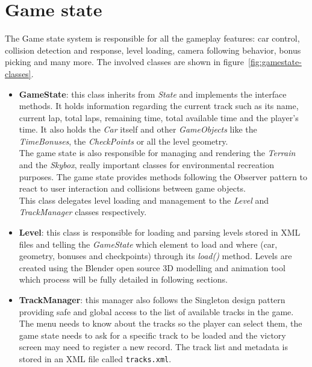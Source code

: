 \section{Game state}

The Game state system is responsible for all the gameplay features: car control, collision detection
and response, level loading, camera following behavior, bonus picking and many more. The involved
classes are shown in figure~\ref{fig:gamestate-classes}.


\begin{itemize}
	\item \textbf{GameState}: this class inherits from \textit{State} and implements the interface
	methods. It holds information regarding the current track such as its name, current lap, total
	laps, remaining time, total available time and the player's time. It also holds the \textit{Car}
	itself and other \textit{GameObjects} like the \textit{TimeBonuses}, the \textit{CheckPoints}
	or all the level geometry.\\
	
	The game state is also responsible for managing and rendering the \textit{Terrain} and the
	\textit{Skybox}, really important classes for environmental recreation purposes. The game state
	provides methods following the Observer pattern \cite{gamm94} to react to user interaction and
	collisions between game objects.\\
	
	This class delegates level loading and management to the \textit{Level} and \textit{TrackManager}
	classes respectively.
	
	\item \textbf{Level}: this class is responsible for loading and parsing levels stored in XML files and telling
	the \textit{GameState} which element to load and where (car, geometry, bonuses and checkpoints) through
	its \textit{load()} method. Levels are created using the Blender open source 3D modelling and animation
	tool~\cite{hess07} which process will be fully detailed in following sections.
	\item \textbf{TrackManager}: this manager also follows the Singleton design pattern \cite{gamm94}
	providing safe and global access to the list of available tracks in the game. The menu needs to know about
	the tracks so the player can select them, the game state needs to ask for a specific track to be loaded
	and the victory screen may need to register a new record. The track list and metadata is stored
	in an XML file called \texttt{tracks.xml}.
	

\end{itemize}
